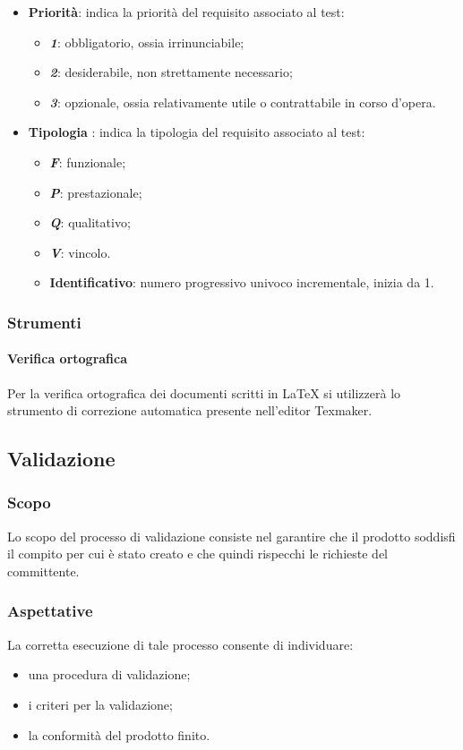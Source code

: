 			\begin{itemize}
				\item \textbf{Priorità}: indica la priorità del requisito associato al test:
				\begin{itemize}
					\item \textbf{\textit{1}}: obbligatorio, ossia irrinunciabile;
					\item \textbf{\textit{2}}: desiderabile, non strettamente necessario;
					\item \textbf{\textit{3}}: opzionale, ossia relativamente utile o contrattabile in corso d'opera.
				\end{itemize}
				\item \textbf{Tipologia} : indica la tipologia del requisito associato al test:
				\begin{itemize}
					\item \textbf{\textit{F}}: funzionale;
					\item \textbf{\textit{P}}: prestazionale;
					\item \textbf{\textit{Q}}: qualitativo;
					\item \textbf{\textit{V}}: vincolo.
					\item \textbf{Identificativo}: numero progressivo univoco incrementale, inizia da 1.
				\end{itemize}
			\end{itemize}
			\subsubsection{Strumenti}
			\paragraph{Verifica ortografica}
			Per la verifica ortografica dei documenti scritti in \LaTeX{} si utilizzerà lo strumento di correzione automatica presente nell’editor Texmaker.

	\subsection{Validazione}
		\subsubsection{Scopo}
			Lo scopo del processo di validazione consiste nel garantire che il prodotto soddisfi il compito per cui è stato creato e che quindi rispecchi le richieste del committente.
		\subsubsection{Aspettative}
			La corretta esecuzione di tale processo consente di individuare:
			\begin{itemize}
				\item una procedura di validazione;
				\item i criteri per la validazione;
				\item la conformità del prodotto finito.
			\end{itemize}
